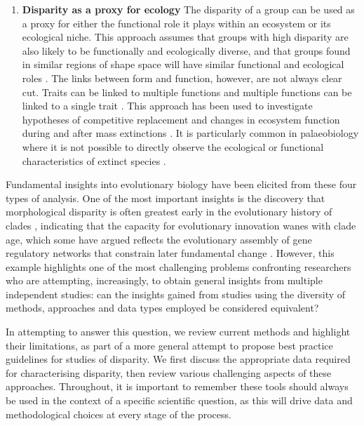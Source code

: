 \documentclass[12pt,letterpaper]{article}
\begin{document}
\begin{enumerate}
	\item \textbf{Disparity as a proxy for ecology} The disparity of a group can be used as a proxy for either the functional role it plays within an ecosystem or its ecological niche.
	This approach assumes that groups with high disparity are also likely to be functionally and ecologically diverse, and that groups found in similar regions of shape space will have similar functional and ecological roles
	\citep{Friedman2010-ve, Pierce2008-yr, Anderson2013-zt}.
	The links between form and function, however, are not always clear cut.
	Traits can be linked to multiple functions and multiple functions can be linked to a single trait \citep{Wainwright2005-or}.
	This approach has been used to investigate hypotheses of competitive replacement \citep{Brusatte2008-vx} and changes in ecosystem function during and after mass extinctions \citep{Friedman2010-ve}.
	It is particularly common in palaeobiology where it is not possible to directly observe the ecological or functional characteristics of extinct species \citep{Wainwright2005-or}.



\end{enumerate}

Fundamental insights into evolutionary biology have been elicited from these four types of analysis.
One of the most important insights is the discovery that morphological disparity is often greatest early in the evolutionary history of clades \citep{Foote1997-nl, Erwin2007-jz, Hughes2013-td}, indicating that the capacity for evolutionary innovation wanes with clade age, which some have argued reflects the evolutionary assembly of gene regulatory networks that constrain later fundamental change  \citep{Erwin2007-jz, Hughes2013-td}.
However, this example highlights one of the most challenging problems confronting researchers who are attempting, increasingly, to obtain general insights from multiple independent studies: can the insights gained from studies using the diversity of methods, approaches and data types employed be considered equivalent?

In attempting to answer this question, we review current methods and highlight their limitations, as part of a more general attempt to propose best practice guidelines for studies of disparity.
We first discuss the appropriate data required for characterising disparity, then review various challenging aspects of these approaches.
Throughout, it is important to remember these tools should always be used in the context of a specific scientific question, as this will drive data and methodological choices at every stage of the process.
\end{document}
